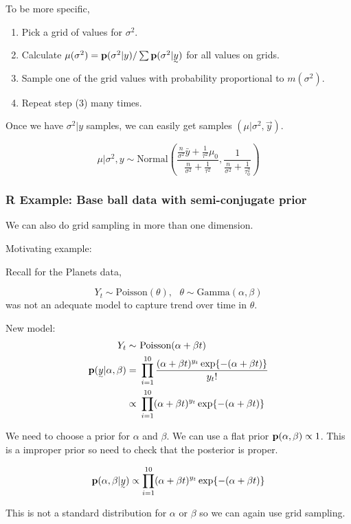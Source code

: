 To be more specific, 

\begin{enumerate}[(1)]
    \item Pick a grid of values for $\sigma^2$.
    \item Calculate $\mu(\sigma^2) = \p(\sigma^2|y) / \sum \p(\sigma^2| \vec{y})$ for all values on grids.
    \item Sample one of the grid values with probability proportional to $m(\sigma^2)$.
    \item Repeat step (3) many times.
\end{enumerate}

Once we have $\sigma^2|y$ samples, we can easily get samples $(\mu| \sigma^2, \vec{y})$.

\[
\mu| \sigma^2, y \sim \text{Normal}(\frac{\frac{n}{\sigma^2} \bar{y} + \frac{1}{\tau^2} \mu_0}{\frac{n}{\sigma^2} + \frac{1}{\tau^2}}, \frac{1}{\frac{n}{\sigma^2} + \frac{1}{\tau_0^2}})
\]

\subsubsection{R Example: Base ball data with semi-conjugate prior}

We can also do grid sampling in more than one dimension. 

Motivating example: 

Recall for the Planets data,

\[
Y_t \sim \text{Poisson}(\theta), ~~~ \theta \sim \text{Gamma}(\alpha, \beta) 
\]
was not an adequate model to capture trend over time in $\theta$.

New model:
\begin{align*}
    Y_t \sim&~ \text{Poisson}(\alpha + \beta t)\\
    \p(\vec{y}| \alpha, \beta) 
    =&~ \prod_{i=1}^{10} \frac{(\alpha + \beta t)^{y_t} \exp{-(\alpha + \beta t)}}{y_t!}\\
    \propto&~ \prod_{i=1}^{10} (\alpha + \beta t)^{y_t} \exp{-(\alpha + \beta t)}
\end{align*}

We need to choose a prior for $\alpha$ and $\beta$. We can use a flat prior ${\mathbf p}(\alpha, \beta) \propto 1$. This is a improper prior so need to check that the posterior is proper.

\[
\p(\alpha, \beta| \vec{y}) \propto \prod_{i=1}^{10} (\alpha + \beta t)^{y_t} \exp{-(\alpha + \beta t)}
\]

This is not a standard distribution for $\alpha$ or $\beta$ so we can again use grid sampling.

